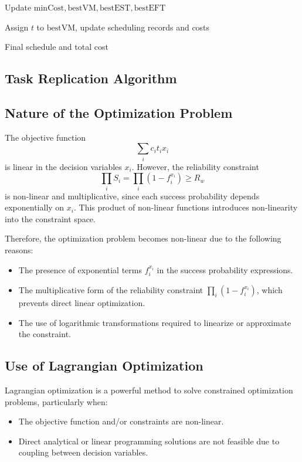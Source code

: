\documentclass[12pt]{tcc}
\begin{document}
\begin{algorithm}[H]
\begin{algorithmic}[1]
                \State Update \( \text{minCost}, \text{bestVM}, \text{bestEST}, \text{bestEFT} \)
            \EndIf
        \EndIf
    \EndFor

    \State Assign \( t \) to \( \text{bestVM} \), update scheduling records and costs
\EndFor

\State \Return Final schedule and total cost

\end{algorithmic}
\end{algorithm}

\subsection*{Task Replication Algorithm}
 \subsection*{Nature of the Optimization Problem}

The objective function 
\[
\sum_{i} c_i t_i x_i
\]
is linear in the decision variables \( x_i \). However, the reliability constraint
\[
\prod_{i} S_i = \prod_{i} (1 - f_i^{x_i}) \geq R_w
\]
is non-linear and multiplicative, since each success probability depends exponentially on \( x_i \). This product of non-linear functions introduces non-linearity into the constraint space.

Therefore, the optimization problem becomes non-linear due to the following reasons:
\begin{itemize}
    \item The presence of exponential terms \( f_i^{x_i} \) in the success probability expressions.
    \item The multiplicative form of the reliability constraint \( \prod_i (1 - f_i^{x_i}) \), which prevents direct linear optimization.
    \item The use of logarithmic transformations required to linearize or approximate the constraint.
\end{itemize}

\subsection*{Use of Lagrangian Optimization}

Lagrangian optimization is a powerful method to solve constrained optimization problems, particularly when:
\begin{itemize}
    \item The objective function and/or constraints are non-linear.
    \item Direct analytical or linear programming solutions are not feasible due to coupling between decision variables.
\end{itemize}
	
\end{document}
